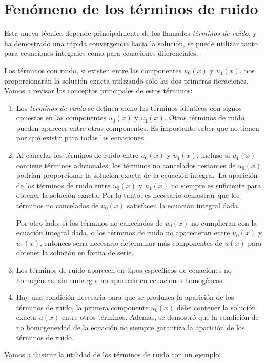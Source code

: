 \section{Fenómeno de los términos de ruido}
Esta nueva técnica depende principalmente de los llamados \textit{términos de ruido}, y ha demostrado una rápida convergencia hacia la solución, se puede utilizar tanto para ecuaciones integrales como para ecuaciones diferenciales.

Los términos con ruido, si existen entre las componentes $u_0(x)$ y $u_1(x)$, nos proporcionarán la solución exacta utilizando sólo las dos primeras iteraciones. Vamos a revisar los conceptos principales de estos términos:
\begin{enumerate}
	\item Los \textit{términos de ruido} se definen como los términos idénticos con signos opuestos en las componentes $u_0(x)$ y $u_1(x)$. Otros términos de ruido pueden aparecer entre otras componentes. Es importante saber que no tienen por qué existir para todas las ecuaciones.
	\item Al cancelar los términos de ruido entre $u_0(x)$ y $u_1(x)$, incluso si $u_1(x)$ contiene términos adicionales, los términos no cancelados restantes de $u_0(x)$ podrían proporcionar la solución exacta de la ecuación integral. La aparición de los términos de ruido entre $u_0(x)$ y $u_1(x)$ no siempre es suficiente para obtener la solución exacta. Por lo tanto, es necesario demostrar que los términos no cancelados de $u_0(x)$ satisfacen la ecuación integral dada. 
	
	Por otro lado, si los términos no cancelados de $u_0(x)$ no cumplieran con la ecuación integral dada, o los términos de ruido no aparecieran entre $u_0(x)$ y $u_1(x)$, entonces sería necesario determinar más componentes de $u(x)$ para obtener la solución en forma de serie.
	\item Los términos de ruido aparecen en tipos específicos de ecuaciones no homogéneas, sin embargo, no aparecen en ecuaciones homogéneas.
	\item Hay una condición necesaria para que se produzca la aparición de los términos de ruido, la primera componente $u_0(x)$ debe contener la solución exacta $u(x)$ entre otros términos. Además, se demostró que la condición de no homogeneidad de la ecuación no siempre garantiza la aparición de los términos de ruido.
\end{enumerate}
Vamos a ilustrar la utilidad de los términos de ruido con un ejemplo:
